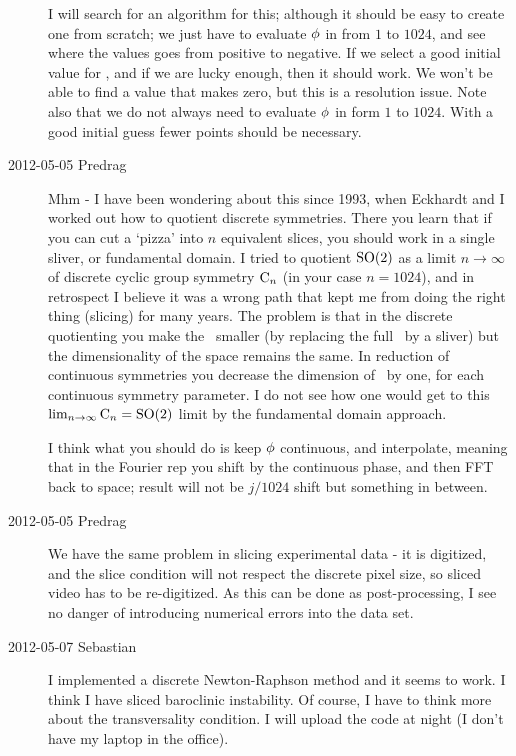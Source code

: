 \begin{description}
I will search for an algorithm for this; although it should be easy to
create one from scratch; we just have to evaluate ${\bf \phi}$ in
 from $1$ to $1024$, and see where the values goes from
positive to negative. If we select a good initial value for ,
and if we are lucky enough, then it should work. We won't be able to find
a value that makes  zero, but this is a resolution issue.
Note also that we do not always need to evaluate ${\bf \phi}$ in
 form $1$ to $1024$. With a good initial guess fewer points
should be necessary.

\item[2012-05-05 Predrag]                                   \toCB
Mhm - I have been wondering about this since 1993, when Eckhardt and
I worked out how to
 {quotient discrete
symmetries}. There you learn that if you can cut a `pizza' into $n$
equivalent slices, you should work in a single sliver, or fundamental
domain. I tried to quotient $\textrm{SO}(2)$ as a limit $ n \to \infty$ of
discrete cyclic group symmetry $\textrm{C}_{n}$ (in your case $n=1024$), and in
retrospect I believe it was a wrong path that kept me from doing the
right thing (slicing) for many years. The problem is that in the discrete
quotienting you make the \reducedsp\ smaller (by replacing the full
\statesp\ by a sliver) but the dimensionality of the space remains the
same. In reduction of continuous symmetries you decrease the dimension of
\statesp\ by one, for each continuous symmetry parameter. I do not see how
one would get to this $\lim_{n \to \infty} \textrm{C}_{n} = \textrm{SO}(2)$ limit by
the fundamental domain approach.

I think what you should do is keep ${\bf \phi}$ continuous, and interpolate,
meaning that in the Fourier rep you shift by the continuous phase, and
then FFT back to space; result will not be $j/1024$ shift but something
in between.

\item[2012-05-05 Predrag]                                   \toCB
We have the same problem in slicing experimental data - it is digitized,
and the slice condition will not respect the discrete pixel size, so
sliced video has to be re-digitized. As this can be done as
post-processing, I see no danger of introducing numerical errors into the
data set.


\item[2012-05-07 Sebastian]
I implemented a discrete Newton-Raphson method and it seems to work. I
think I have sliced baroclinic instability. Of course, I have to think
more about the transversality condition. I will upload the code at night
(I don't have my laptop in the office).


\end{description}
